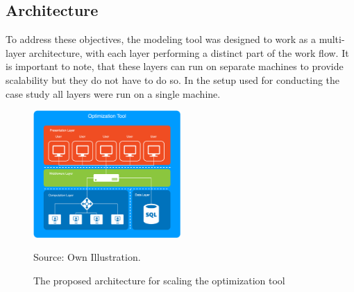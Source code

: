 \documentclass[
	11pt,								%
	DIV10,								%
	a4paper,         					%
	oneside,							%
	headheight=20pt,					%
	footheight=20pt,					%
    parskip=full,						%
    listof=totoc,						%
	bibliography=totoc,					%
	index=totoc,						%
]{scrartcl}
\begin{document}
\subsection{Architecture}
To address these objectives, the modeling tool was designed to work as a multi-layer architecture, with each layer performing a distinct part of the work flow. It is important to note, that these layers can run on separate machines to provide scalability but they do not have to do so. In the setup used for conducting the case study all layers were run on a single machine. 
\begin{figure}[H]
	\centering
	\includegraphics[width=0.5\textwidth]{pictures/ARCHITECTURE.png}
	\caption{The proposed architecture for scaling the optimization tool}
	\label{architecture}
	\flushleft\quad\quad\footnotesize{Source: Own Illustration.}
\end{figure}	
\end{document}
